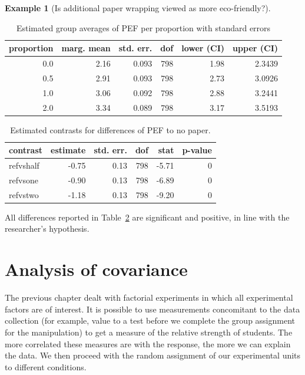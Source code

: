 \documentclass[
  11pt,
  letterpaper,
]{scrbook}
\theoremstyle{definition}
\theoremstyle{definition}
\newtheorem{example}{Example}[chapter]
\theoremstyle{remark}
\begin{document}
\begin{example}[Is additional paper wrapping viewed as more
eco-friendly?]
\begin{longtable}[t]{rrrrrr}
\caption{\label{tbl-print-groupmeans-PEF}Estimated group averages of PEF
per proportion with standard errors}

\tabularnewline

\toprule
proportion & marg. mean & std. err. & dof & lower (CI) & upper (CI)\\
\midrule
0.0 & 2.16 & 0.093 & 798 & 1.98 & 2.3439\\
0.5 & 2.91 & 0.093 & 798 & 2.73 & 3.0926\\
1.0 & 3.06 & 0.092 & 798 & 2.88 & 3.2441\\
2.0 & 3.34 & 0.089 & 798 & 3.17 & 3.5193\\
\bottomrule

\end{longtable}

\begin{longtable}[t]{lrrrrr}

\caption{\label{tbl-print-contrast-PEF}Estimated contrasts for
differences of PEF to no paper.}

\tabularnewline

\toprule
contrast & estimate & std. err. & dof & stat & p-value\\
\midrule
refvshalf & -0.75 & 0.13 & 798 & -5.71 & 0\\
refvsone & -0.90 & 0.13 & 798 & -6.89 & 0\\
refvstwo & -1.18 & 0.13 & 798 & -9.20 & 0\\
\bottomrule

\end{longtable}

All differences reported in Table~\ref{tbl-print-contrast-PEF} are
significant and positive, in line with the researcher's hypothesis.

\end{example}

\section{Analysis of covariance}\label{analysis-of-covariance}

The previous chapter dealt with factorial experiments in which all
experimental factors are of interest. It is possible to use measurements
concomitant to the data collection (for example, value to a test before
we complete the group assignment for the manipulation) to get a measure
of the relative strength of students. The more correlated these measures
are with the response, the more we can explain the data. We then proceed
with the random assignment of our experimental units to different
conditions.
\end{document}
